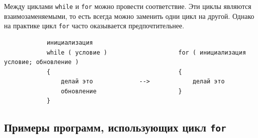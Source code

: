 \documentclass[10pt]{article}
\begin{document}
\noindent Между циклами \texttt{while} и \texttt{for} можно провести соответствие. Эти циклы являются взаимозаменяемыми, то есть всегда можно заменить одни цикл на другой. Однако на практике цикл \texttt{for} часто оказывается предпочтительнее.
\begin{lstlisting}
            инициализация
            while ( условие )                    for ( инициализация  условие; обновление )
            {                                    {        
                делай это             -->            делай это                       
                обновление                       }                     
            }                                  
\end{lstlisting}

\subsection*{Примеры программ, использующих цикл \texttt{for}}
\end{document}
